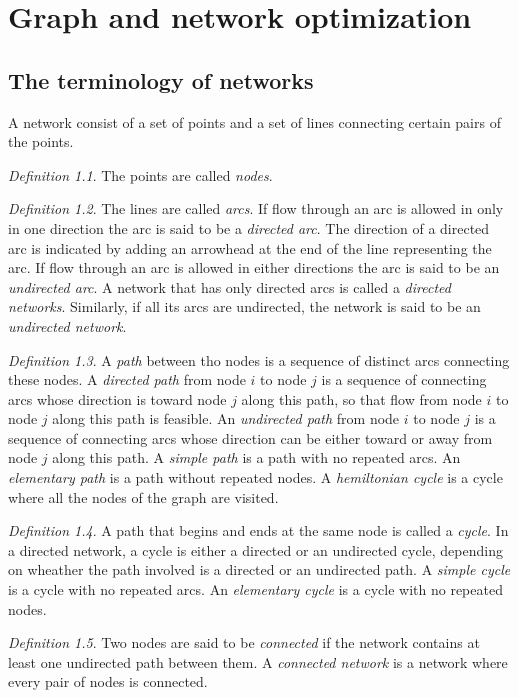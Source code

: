\documentclass[12pt, a4paper]{report}
\theoremstyle{remark}
\newtheorem*{remark}{Definition}
\begin{document}
\newpage

\chapter{Graph and network optimization}
\section{The terminology of networks}
A network consist of a set of points and a set of lines connecting certain pairs of the points.
\begin{remark}
    The points are called \emph{nodes}. 
\end{remark}
\begin{remark}
    The lines are called \emph{arcs}. If flow through an arc is allowed in only in one direction the arc is said to be a 
    \emph{directed arc}. The direction of a directed arc is indicated by adding an arrowhead at the end of the line representing the arc. 
    If flow through an arc is allowed in either directions the arc is said to be an \emph{undirected arc}.
    A network that has only directed arcs is called a \emph{directed networks}. Similarly, if all its arcs are undirected,
    the network is said to be an \emph{undirected network}. 
\end{remark}
\begin{remark}
    A \emph{path} between tho nodes is a sequence of distinct arcs connecting these nodes. A \emph{directed path} from node $i$ to
    node $j$ is a sequence of connecting arcs whose direction is toward node $j$ along this path, so that flow from node $i$ to node
    $j$ along this path is feasible. An \emph{undirected path} from node $i$ to node $j$ is a sequence of connecting arcs whose 
    direction can be either toward or away from node $j$ along this path. A \emph{simple path} is a path with no repeated arcs. 
    An \emph{elementary path} is a path without repeated nodes. A \emph{hemiltonian cycle} is a cycle where all the nodes of the graph 
    are visited.
\end{remark}
\begin{remark}
    A path that begins and ends at the same node is called a \emph{cycle}. In a directed network, a cycle is either a directed or an
    undirected cycle, depending on wheather the path involved is a directed or an undirected path. A \emph{simple cycle} is a cycle with no repeated arcs.
    An \emph{elementary cycle} is a cycle with no repeated nodes.
\end{remark}
\begin{remark}
    Two nodes are said to be \emph{connected} if the network contains at least one undirected path between them. A \emph{connected network} 
    is a network where every pair of nodes is connected.
\end{remark}
\end{document}
